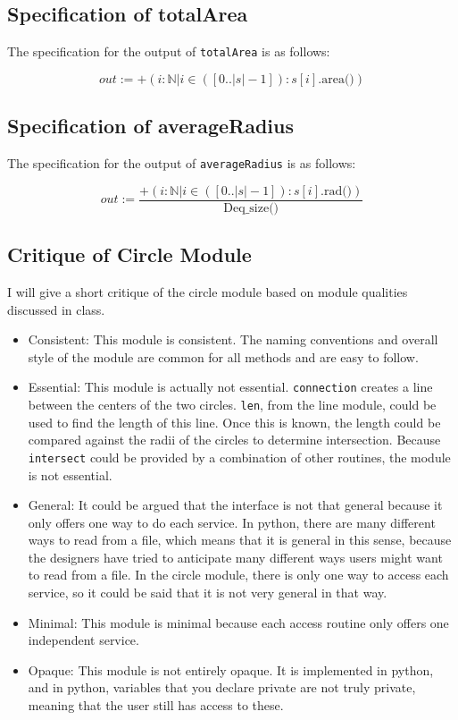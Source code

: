 \documentclass[12pt]{article}
\begin{document}
\subsection{Specification of totalArea}

The specification for the output of {\tt totalArea} is as follows:

$$out := +(i: \mathbb{N} | i \in ([0 .. |s|-1]):
  s[i].\mbox{area()})$$

\subsection{Specification of averageRadius}

The specification for the output of {\tt averageRadius} is as follows:

$$ out := \frac{+(i: \mathbb{N} | i \in ([0 .. |s|-1]):
  s[i].\mbox{rad()})} {\mbox{Deq\_}\mbox{size()}}$$

\subsection{Critique of Circle Module}

I will give a short critique of the circle module based on module qualities discussed in class. 

\begin{itemize}
\item
Consistent: This module is consistent. The naming conventions and overall style of the module are common for all methods and are easy to follow.
\item
Essential: This module is actually not essential. {\tt connection} creates a line between the centers of the two circles. {\tt len}, from the line module, could be used to find the length of this line. Once this is known, the length could be compared against the radii of the circles to determine intersection. Because {\tt intersect} could be provided by a combination of other routines, the module is not essential. 
\item
General: It could be argued that the interface is not that general because it only offers one way to do each service. In python, there are many different ways to read from a file, which means that it is general in this sense, because the designers have tried to anticipate many different ways users might want to read from a file. In the circle module, there is only one way to access each service, so it could be said that it is not very general in that way.
\item
Minimal: This module is minimal because each access routine only offers one independent service.
\item
Opaque: This module is not entirely opaque. It is implemented in python, and in python, variables that you declare private are not truly private, meaning that the user still has access to these. 
\end{itemize}
\end{document}
